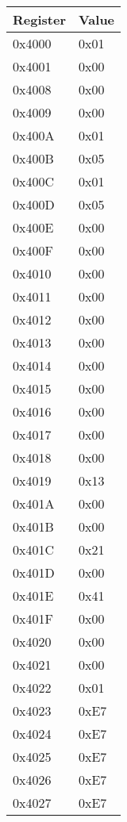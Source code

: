 \begin{tabular}{ll}
	Register & Value \\
	\hline
	\hline
	0x4000 & 0x01 \\
	0x4001 & 0x00 \\
	0x4008 & 0x00 \\
	0x4009 & 0x00 \\
	0x400A & 0x01 \\
	0x400B & 0x05 \\
	0x400C & 0x01 \\
	0x400D & 0x05 \\
	0x400E & 0x00 \\
	0x400F & 0x00 \\
	0x4010 & 0x00 \\
	0x4011 & 0x00 \\
	0x4012 & 0x00 \\
	0x4013 & 0x00 \\
	0x4014 & 0x00 \\
	0x4015 & 0x00 \\
	0x4016 & 0x00 \\
	0x4017 & 0x00 \\
	0x4018 & 0x00 \\
	0x4019 & 0x13 \\
	0x401A & 0x00 \\
	0x401B & 0x00 \\
	0x401C & 0x21 \\
	0x401D & 0x00 \\
	0x401E & 0x41 \\
	0x401F & 0x00 \\
	0x4020 & 0x00 \\
	0x4021 & 0x00 \\
	0x4022 & 0x01 \\
	0x4023 & 0xE7 \\
	0x4024 & 0xE7 \\
	0x4025 & 0xE7 \\
	0x4026 & 0xE7 \\
	0x4027 & 0xE7 \\
	\hline
\end{tabular}

\quad

